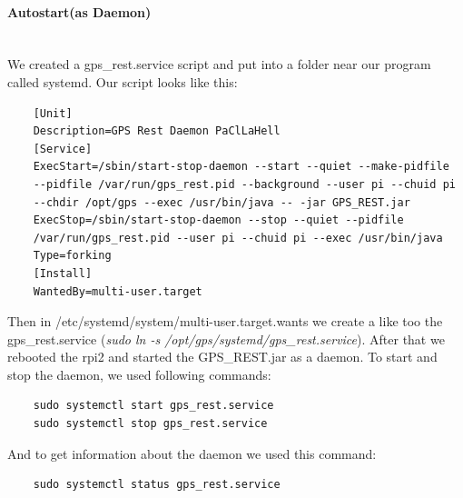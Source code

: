 \paragraph{Autostart(as Daemon)} \mbox{}\\
We created a gps\_rest.service script and put into a folder near our program called systemd. Our script looks like this:
\begin{verbatim}
	[Unit]
	Description=GPS Rest Daemon PaClLaHell
	[Service]
	ExecStart=/sbin/start-stop-daemon --start --quiet --make-pidfile 
	--pidfile /var/run/gps_rest.pid --background --user pi --chuid pi 
	--chdir /opt/gps --exec /usr/bin/java -- -jar GPS_REST.jar
	ExecStop=/sbin/start-stop-daemon --stop --quiet --pidfile 
	/var/run/gps_rest.pid --user pi --chuid pi --exec /usr/bin/java
	Type=forking
	[Install]
	WantedBy=multi-user.target
\end{verbatim}
Then in /etc/systemd/system/multi-user.target.wants we create a like too the gps\_rest.service (\textit{sudo ln -s /opt/gps/systemd/gps\_rest.service}).
After that we rebooted the \gls{rpi2} and started the GPS\_REST.jar as a daemon.
To start and stop the daemon, we used following commands:
\begin{verbatim}
	sudo systemctl start gps_rest.service
	sudo systemctl stop gps_rest.service
\end{verbatim}
And to get information about the daemon we used this command:
\begin{verbatim}
	sudo systemctl status gps_rest.service
\end{verbatim}
